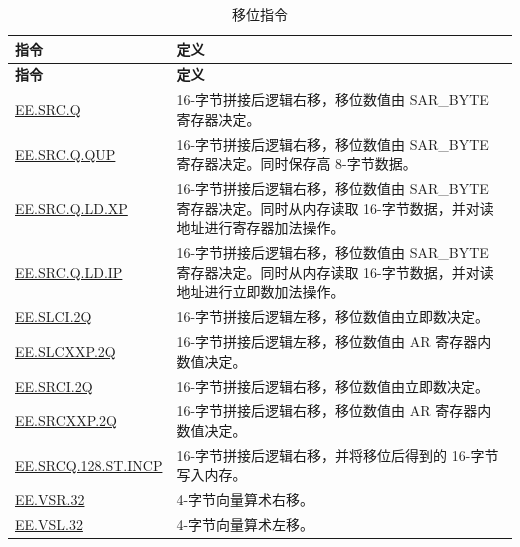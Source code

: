 \begin{longtable}[c]{|l|m{10cm}|}
    \caption{移位指令}
    \label{tab:pie-shift-instructions}\\
    \hline
    \rowcolor{lightgray}
    \textbf{指令} & \textbf{定义} \\\hline
    \endfirsthead
    \rowcolor{lightgray}
    \textbf{指令} & \textbf{定义} \\\hline
    \endhead
    \endfoot
    
    \hyperref[instruction:EESRCQ]{EE.SRC.Q} & 16-字节拼接后逻辑右移，移位数值由 SAR\_BYTE 寄存器决定。
    \\\hline
    \hyperref[instruction:EESRCQQUP]{EE.SRC.Q.QUP} & 16-字节拼接后逻辑右移，移位数值由 SAR\_BYTE 寄存器决定。同时保存高 8-字节数据。
    \\\hline
    \hyperref[instruction:EESRCQLDXP]{EE.SRC.Q.LD.XP} & 16-字节拼接后逻辑右移，移位数值由 SAR\_BYTE 寄存器决定。同时从内存读取 16-字节数据，并对读地址进行寄存器加法操作。
    \\\hline
    \hyperref[instruction:EESRCQLDIP]{EE.SRC.Q.LD.IP} & 16-字节拼接后逻辑右移，移位数值由 SAR\_BYTE 寄存器决定。同时从内存读取 16-字节数据，并对读地址进行立即数加法操作。
    \\\hline
    \hyperref[instruction:EESLCI2Q]{EE.SLCI.2Q} & 16-字节拼接后逻辑左移，移位数值由立即数决定。
    \\\hline
    \hyperref[instruction:EESLCXXP2Q]{EE.SLCXXP.2Q} & 16-字节拼接后逻辑左移，移位数值由 AR 寄存器内数值决定。
    \\\hline
    \hyperref[instruction:EESRCI2Q]{EE.SRCI.2Q} & 16-字节拼接后逻辑右移，移位数值由立即数决定。
    \\\hline
    \hyperref[instruction:EESRCXXP2Q]{EE.SRCXXP.2Q} & 16-字节拼接后逻辑右移，移位数值由 AR 寄存器内数值决定。
    \\\hline
    \hyperref[instruction:EESRCQ128STINCP]{EE.SRCQ.128.ST.INCP} & 16-字节拼接后逻辑右移，并将移位后得到的 16-字节写入内存。
    \\\hline
    \hyperref[instruction:EEVSR32]{EE.VSR.32} & 4-字节向量算术右移。
    \\\hline
    \hyperref[instruction:EEVSL32]{EE.VSL.32} & 4-字节向量算术左移。
    \\\hline
\end{longtable}